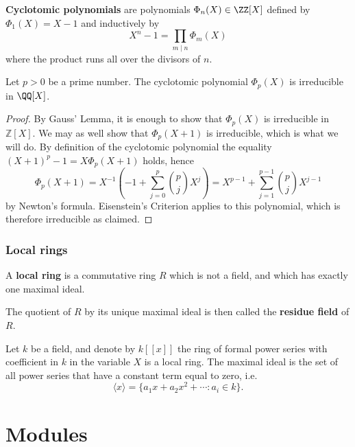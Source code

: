 \documentclass[12pt, a4paper]{article}
\begin{document}
\begin{definition}
    \textbf{Cyclotomic polynomials} are polynomials \(\Phi_n(X) \in \ZZ[X]\) defined by \(\Phi_1(X)=X-1\) and inductively by 
    \[X^n-1=\prod_{m \mid n} \Phi_m(X)\]
    where the product runs all over the divisors of \(n\).
\end{definition}

\begin{corollary}
    Let \(p>0\) be a prime number. The cyclotomic polynomial \(\Phi_p(X)\) is irreducible in \(\QQ[X]\).
\end{corollary}

\begin{proof}
    By Gauss' Lemma, it is enough to show that \( \Phi_p(X) \) is irreducible in \( \mathbb{Z}[X] \). We may as well show that \( \Phi_p(X + 1) \) is irreducible, which is what we will do. By definition of the cyclotomic polynomial the equality \( (X + 1)^p - 1 = X\Phi_p(X + 1) \) holds, hence
    \[
    \Phi_p(X + 1) = X^{-1} \left( -1 + \sum_{j=0}^{p} \binom{p}{j} X^j \right) = X^{p-1} + \sum_{j=1}^{p-1} \binom{p}{j} X^{j-1}
    \]
    by Newton's formula. Eisenstein's Criterion applies to this polynomial, which is therefore irreducible as claimed. 
\end{proof}

\subsubsection{Local rings}

\begin{definition}
    A \textbf{local ring} is a commutative ring \(R\) which is not a field, and which has exactly one maximal ideal.
\end{definition}

\begin{definition}
    The quotient of \(R\) by its unique maximal ideal is then called the \textbf{residue field} of \(R\).
\end{definition}

\begin{mdexample}
    Let \(k\) be a field, and denote by \(k[[x]]\) the ring of formal power series with coefficient in \(k\) in the variable \(X\) is a local ring. The maximal ideal is the set of all power series that have a constant term equal to zero, i.e.
    \[\langle x\rangle = \{a_1x+a_2x^2 + \cdots : a_i \in k\}.\]
\end{mdexample}

\section{Modules}
\end{document}
